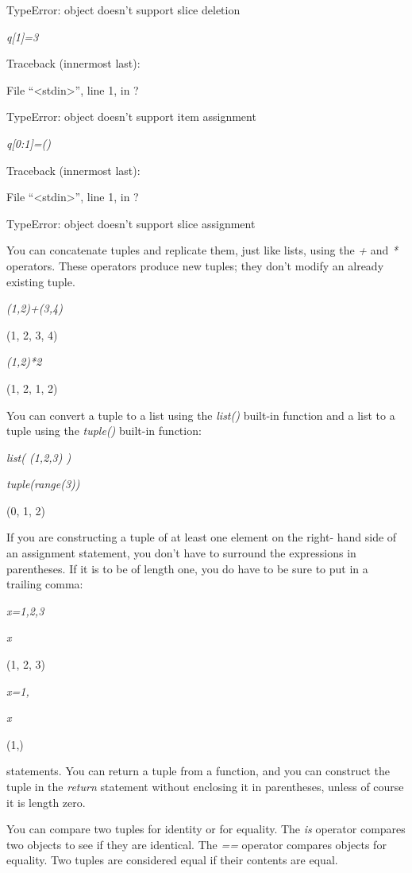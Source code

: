 TypeError: object doesn't support
slice deletion


\emph{q{[}1{]}=3}

Traceback (innermost last):

 File
``\textless{}stdin\textgreater{}'', line 1, in ?

TypeError: object doesn't support
item assignment


\emph{q{[}0:1{]}=()}

Traceback (innermost last):

 File
``\textless{}stdin\textgreater{}'', line 1, in ?

TypeError: object doesn't support
slice assignment

You can concatenate tuples and
replicate them, just like lists, using the \emph{+} and \emph{*}
operators. These operators produce new tuples; they don't modify an
already existing tuple.


\emph{(1,2)+(3,4)}

(1, 2, 3, 4)


\emph{(1,2)*2}

(1, 2, 1, 2)

You can convert a tuple to a list
using the \emph{list()} built-in function and a list to a tuple using
the \emph{tuple()} built-in function:


\emph{list( (1,2,3) )}




\emph{tuple(range(3))}

(0, 1, 2)

If you are constructing a tuple of
at least one element on the right- hand side of an assignment statement,
you don't have to surround the expressions in parentheses. If it is to
be of length one, you do have to be sure to put in a trailing comma:


\emph{x=1,2,3}


\emph{x}

(1, 2, 3)


\emph{x=1,}


\emph{x}

(1,)


statements. You can return a tuple from a function, and you can
construct the tuple in the \emph{return} statement without enclosing it
in parentheses, unless of course it is length zero.

You can compare two tuples for
identity or for equality. The \emph{is} operator compares two objects to
see if they are identical. The \emph{==} operator compares objects for
equality. Two tuples are considered equal if their contents are equal.


